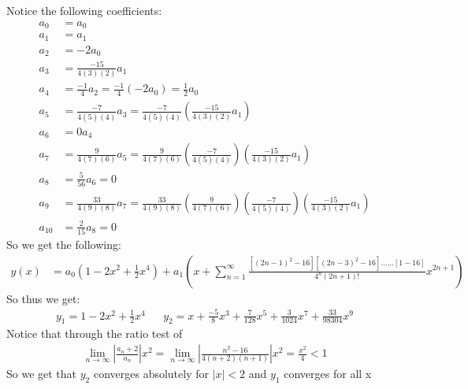 \documentclass[12pt]{article}
\begin{document}
\newpage

Notice the following coefficients:
	\begin{align*}
		a_0 &= a_0 \\
		a_1 &= a_1 \\
		a_2 &= -2a_0 \\
		a_3 &= \frac{-15}{4(3)(2)}a_1 \\
		a_4 &= \frac{-1}{4}a_2 = \frac{-1}{4}(-2a_0) = \frac{1}{2}a_0 \\
		a_5 &= \frac{-7}{4(5)(4)}a_3 = \frac{-7}{4(5)(4)}\left(\frac{-15}{4(3)(2)}a_1\right) \\
		a_6 &= 0a_4 \\
		a_7 &= \frac{9}{4(7)(6)}a_5 =\frac{9}{4(7)(6)}\left( \frac{-7}{4(5)(4)}\right)\left(\frac{-15}{4(3)(2)}a_1\right) \\
		a_8 &= \frac{5}{56}a_6 = 0 \\
		a_9 &= \frac{33}{4(9)(8)}a_7 = \frac{33}{4(9)(8)}\left(\frac{9}{4(7)(6)}\right)\left( \frac{-7}{4(5)(4)}\right)\left(\frac{-15}{4(3)(2)}a_1\right) \\
		a_{10} &= \frac{2}{15}a_8 = 0
	\end{align*}
So we get the following:
	\begin{align*}
		y(x) &= a_0\left(1 - 2x^2 + \frac{1}{2}x^4\right) + a_1\left(x + \sum_{n = 1}^{\infty}\frac{[(2n - 1)^2 - 16][(2n-3)^2-16]......[1 - 16]}{4^n (2n+1)!}x^{2n+1}\right)
	\end{align*}
So thus we get:
	\begin{align*}
		y_1 = 1 - 2x^2 + \frac{1}{2}x^4 && y_2 = x + \frac{-5}{8}x^3 + \frac{7}{128}x^5 + \frac{3}{1024}x^7 + \frac{33}{98304}x^9
	\end{align*}
Notice that through the ratio test of 
	\begin{align*}
		\lim\limits_{n \rightarrow \infty} \left|\frac{a_n+2}{a_n}\right|x^{2}= \lim\limits_{n \rightarrow \infty} \left|\frac{n^2 - 16}{4(n+2)(n+1)}\right|x^{2} = \frac{x^2}{4} < 1
	\end{align*}
So we get that $y_2$ converges absolutely for $|x| < 2$ and $y_1$ converges for all x
\end{document}
